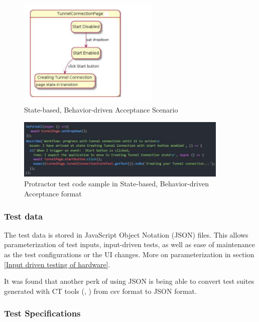 \documentclass[conference]{IEEEtran}
\begin{document}
	\begin{figure}[!b]
		\includegraphics[width=0.60\textwidth,]{stateBasedScenario.pdf}
		\caption{State-based, Behavior-driven Acceptance Scenario}
		\label{fig:stateBasedScenario}
	\end{figure}

	\begin{figure}[!h]
		\centering
			\includegraphics[width=0.90\textwidth]{codeSample.pdf}
		\caption{Protractor test code sample in State-based, Behavior-driven Acceptance format}
		\label{fig:codeSample}
	\end{figure}	

	\subsubsection{Test data}
	The test data is stored in JavaScript Object Notation (JSON) files. 
	This allows parameterization of test inputs, input-driven tests, as well as ease of maintenance as the test configurations or the UI changes.
	More on parameterization in section \ref{Input driven testing of hardware}.
	
	It was found that another perk of using JSON is being able to convert test suites generated with CT tools (\cite{gargantini2018migrating}, \cite{ACTS-tool}) from csv format to JSON format.

	\subsubsection{Test Specifications}
\end{document}
